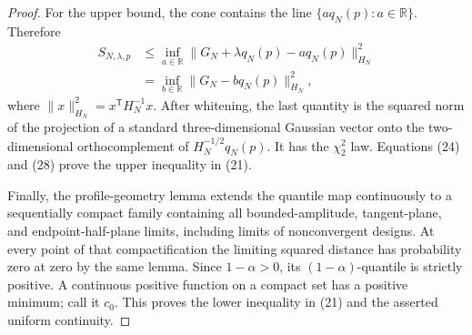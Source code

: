 \documentclass{article}
\begin{document}
\begin{proof}
For the upper bound, the cone contains the line \(\{a q_N(p):a\in\mathbb R\}\).  Therefore
\[
\begin{aligned}
S_{N,\lambda,p}
&\le \inf_{a\in\mathbb R}
 \|G_N+\lambda q_N(p)-a q_N(p)\|_{H_N}^2\\
&=\inf_{b\in\mathbb R}\|G_N-bq_N(p)\|_{H_N}^2,                              \tag{28}
\end{aligned}
\]
where \(\|x\|_{H_N}^2=x^{\mathsf T}H_N^{-1}x\).  After whitening, the last quantity is the squared norm of the projection of a standard three-dimensional Gaussian vector onto the two-dimensional orthocomplement of \(H_N^{-1/2}q_N(p)\).  It has the \(\chi^2_2\) law.  Equations (24) and (28) prove the upper inequality in (21).

Finally, the profile-geometry lemma extends the quantile map continuously to a sequentially compact family containing all bounded-amplitude, tangent-plane, and endpoint-half-plane limits, including limits of nonconvergent designs.  At every point of that compactification the limiting squared distance has probability zero at zero by the same lemma.  Since \(1-\alpha>0\), its \((1-\alpha)\)-quantile is strictly positive.  A continuous positive function on a compact set has a positive minimum; call it \(c_0\).  This proves the lower inequality in (21) and the asserted uniform continuity.
\end{proof}
\end{document}
